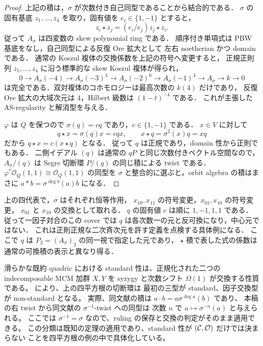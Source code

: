 \begin{proof}
上記の積は，$\sigma$ が次数付き自己同型であることから結合的である．
$\sigma$ の固有基底 $z_1,\ldots,z_4$ を取り，固有値を $e_i\in\{1,-1\}$ とすると，
\[
 z_i\star z_j=(e_i/e_j)z_j\star z_i.
\]
従って $A_\sigma$ は四変数の skew polynomial ring である．
順序付き単項式は PBW 基底をなし，自己同型による反復 Ore 拡大として
左右 noetherian かつ domain である．
通常の Koszul 複体の交換係数を上記の符号へ変更すると，
正規正則列 $z_1,\ldots,z_4$ に沿う標準的な skew Koszul 複体が得られ，
\[
 0\longrightarrow A_\sigma(-4)
 \longrightarrow A_\sigma(-3)^4
 \longrightarrow A_\sigma(-2)^6
 \longrightarrow A_\sigma(-1)^4
 \longrightarrow A_\sigma\longrightarrow k\longrightarrow0
\]
は完全である．双対複体のコホモロジーは最高次数の $k(4)$ だけであり，
反復 Ore 拡大の大域次元は $4$，Hilbert 級数は $(1-t)^{-4}$ である．
これが主張した AS-regularity と解消型を与える．

$\varphi$ は $Q$ を保つので $\sigma(q)=c q$ であり，$c\in\{1,-1\}$ である．
$x\in V$ に対して
\[
 q\star x=\sigma(q)x=c qx,
 \qquad x\star q=\sigma^2(x)q=xq
\]
だから $q\star x=c(x\star q)$ となる．
従って $q$ は正規であり，domain 性から正則でもある．
二側イデアル $(q)$ は通常の $qP$ と同じ次数付きベクトル空間なので，
$A_\sigma/(q)$ は Segre 切断環 $P/(q)$ の同じ積による twist である．
$\varphi^*\mathcal O_Q(1,1)\cong\mathcal O_Q(1,1)$ の同型を
$\sigma$ と整合的に選ぶと，orbit algebra の積はまさに
$a*b=\sigma^{\deg b}(a)b$ になる．
\end{proof}

\begin{remark}
上の四代表で，$\sigma$ はそれぞれ恒等作用，
$x_{10},x_{11}$ の符号変更，$x_{01},x_{10}$ の符号変更，
$x_{01}$ と $x_{10}$ の交換として取れる．
$q$ の固有値 $c$ は順に $1,-1,1,1$ である．
従って一因子対合のこの cover では $q$ は各次数一の元と反可換になり，中心元ではない．
これは正則正規な二次斉次元を許す定義を点検する具体例になる．
ここで $q$ は $P_2=(A_\sigma)_2$ の同一視で指定した元であり，
$\star$ 積で表した式の係数は通常の可換積の表示と異なり得る．
\end{remark}

\begin{remark}
\label{rem:commutative-standard}
滑らかな既約 quadric における standard 性は、正規化された二つの
indecomposable MCM 加群 $X,Y$ を syzygy と次数シフト $\Omega(1)$ が交換する性質である。
\cite[Theorem 4.12]{MUW2026} により、上の四平方根の切断環は
最初の三型が standard、因子交換型が non-standard となる。
実際、同文献の積は $a\cdot b=a\sigma^{\deg a}(b)$ であり、
本稿の右 twist から同文献の $\sigma^{-1}$-twist への同型は
次数 $n$ で $a\mapsto\sigma^{-n}(a)$ と与えられる。
ここでは $\sigma^{-1}=\sigma$ なので、ruling の保存と交換の判定がそのまま適用できる。
この分類は既知の定理の適用であり、standard 性が $(\mathcal C,\mathcal O)$ だけでは決まらない
ことを四平方根の例の中で具体化している。
\end{remark}

